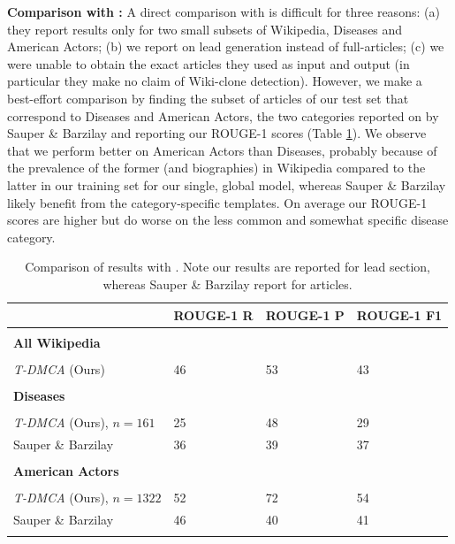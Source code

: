 {\textbf{Comparison with \cite{Sauper2009}:}
A direct comparison with \cite{Sauper2009} is difficult for three reasons: (a) they report
results only for two small subsets of Wikipedia, Diseases and American Actors; 
 (b) we report on lead generation instead of full-articles;
 (c) we were unable to obtain the exact articles they used as input and output (in particular they make no claim of Wiki-clone detection). However, we
 make a best-effort comparison by finding the subset of articles
 of our test set
 that correspond to Diseases and American Actors, the two categories
 reported on by Sauper \& Barzilay and reporting our ROUGE-1 scores
 (Table \ref{sauper_table}). We observe that we perform better
 on American Actors than Diseases, probably because of the 
 prevalence of the former (and biographies) in Wikipedia compared to the latter in our training set for our single, global model, 
 whereas Sauper \& Barzilay likely benefit from the category-specific templates. On average our ROUGE-1 scores
 are higher but do worse on the less common and 
 somewhat specific disease category.
\begin{table}[t]
    \caption{Comparison of results with \cite{Sauper2009}. Note our results are reported
    for lead section, whereas Sauper \& Barzilay report for articles.}
\label{sauper_table}
\begin{center}
\begin{tabular}{llll}
\multicolumn{1}{l}{}
    &\multicolumn{1}{l}{\bf ROUGE-1 R}
    &\multicolumn{1}{l}{\bf ROUGE-1 P}
    &\multicolumn{1}{l}{\bf ROUGE-1 F1}
\\ \hline
\\
\bf All Wikipedia \\ 
\hline\\
\textit{T-DMCA} (Ours)  & 46  & 53  & 43 \\
\\
\bf Diseases \\
\hline \\
\textit{T-DMCA} (Ours), $n=161$ & 25  & 48 & 29 \\
Sauper \& Barzilay  & 36 & 39 & 37 \\
\\
\bf American Actors \\
\hline \\
\textit{T-DMCA} (Ours), $n=1322$   & 52 & 72 & 54 \\
Sauper \& Barzilay  & 46  & 40 & 41 \\ \\
\end{tabular}
\end{center}
\end{table}


}
